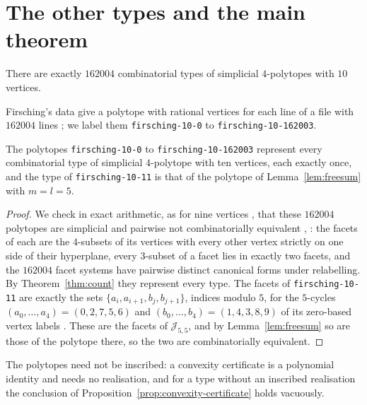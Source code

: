 \section{The other types and the main theorem}
\label{sec:reduction}

\begin{theorem}
  \label{thm:count}
  There are exactly $162004$ combinatorial types of simplicial $4$-polytopes
  with $10$ vertices.
\end{theorem}

Firsching's data \cite{firsching-2017} give a polytope with rational
vertices for each line of a file with $162004$ lines ; we label
them \texttt{firsching-10-0} to \texttt{firsching-10-162003}.

\begin{lemma}
  \label{lem:data}
  The polytopes \texttt{firsching-10-0} to \texttt{firsching-10-162003}
  represent every combinatorial type of simplicial $4$-polytope with ten
  vertices, each exactly once, and the type of \texttt{firsching-10-11} is
  that of the polytope of Lemma~\ref{lem:freesum} with $m = l = 5$.
\end{lemma}

\begin{proof}
  We check in exact arithmetic, as for nine vertices
  \cite[Lemma~6.1]{medgyes-maxvol-d4-n9}, that these $162004$ polytopes are
  simplicial and pairwise not combinatorially equivalent ,
  : the facets of each are the $4$-subsets of its vertices
  with every other vertex strictly on one side of their hyperplane, every
  $3$-subset of a facet lies in exactly two facets, and the $162004$ facet
  systems have pairwise distinct canonical forms under relabelling. By
  Theorem~\ref{thm:count} they represent every type. The facets of
  \texttt{firsching-10-11} are exactly the sets
  $\{a_{i}, a_{i+1}, b_{j}, b_{j+1}\}$, indices modulo $5$, for the
  $5$-cycles $(a_{0}, \ldots, a_{4}) = (0, 2, 7, 5, 6)$ and
  $(b_{0}, \ldots, b_{4}) = (1, 4, 3, 8, 9)$ of its zero-based vertex labels
  . These are the facets of $\mathcal{J}_{5,5}$, and by
  Lemma~\ref{lem:freesum} so are those of the polytope there, so the two are
  combinatorially equivalent.
\end{proof}

The polytopes need not be inscribed: a convexity certificate is a polynomial
identity and needs no realisation, and for a type without an inscribed
realisation the conclusion of Proposition~\ref{prop:convexity-certificate}
holds vacuously.


